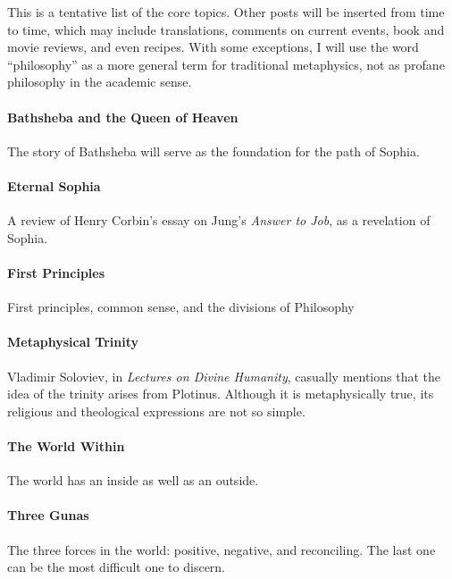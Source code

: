 This is a tentative list of the core topics. Other posts will be inserted from time to time, which may include translations, comments on current events, book and movie reviews, and even recipes. With some exceptions, I will use the word ``philosophy'' as a more general term for traditional metaphysics, not as profane philosophy in the academic sense.

\paragraph{Bathsheba and the Queen of Heaven}


The story of Bathsheba will serve as the foundation for the path of Sophia.

\paragraph{Eternal Sophia}


A review of Henry Corbin's essay on Jung's \emph{Answer to Job}, as a revelation of Sophia.

\paragraph{First Principles}


First principles, common sense, and the divisions of Philosophy

\paragraph{Metaphysical Trinity}


Vladimir Soloviev, in \emph{Lectures on Divine Humanity}, casually mentions that the idea of the trinity arises from Plotinus. Although it is metaphysically true, its religious and theological expressions are not so simple.

\paragraph{The World Within}


The world has an inside as well as an outside.

\paragraph{Three Gunas}


The three forces in the world: positive, negative, and reconciling. The last one can be the most difficult one to discern.

